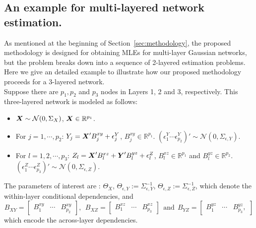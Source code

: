 \subsection{An example for multi-layered network estimation.} \label{appendix:example}
As mentioned at the beginning of Section~\ref{sec:methodology}, the proposed methodology is designed for obtaining MLEs for multi-layer Gaussian networks, but the problem breaks down into a sequence of 2-layered estimation problems. Here we give an detailed example to illustrate how our proposed methodology proceeds for a 3-layered network. \\

Suppose there are $p_1,p_2$ and $p_3$ nodes in Layers 1, 2 and 3, respectively. This three-layered network is modeled as follows: 
\begin{itemize}
 \setlength\itemsep{1pt}
\renewcommand\labelitemi{--}
\item $\boldsymbol{X}\sim \mathcal{N}(0,\Sigma_X)$, $\boldsymbol{X}\in\mathbb{R}^{p_1}$. 
\item For $j=1,\cdots,p_2$: $Y_j = \boldsymbol{X}'B_j^{xy}+\epsilon^Y_j$, $B_j^{xy}\in\mathbb{R}^{p_1}$. $(\epsilon^Y_1  \cdots \epsilon^Y_{p_2})'\sim \mathcal{N}(0,\Sigma_{\epsilon,Y})$. 
\item For $l=1,2,\cdots,p_3$: $Z_l = \boldsymbol{X}'B_l^{xz} + \boldsymbol{Y}'B_l^{yz}+\epsilon_l^Z$, $B_l^{xz}\in\mathbb{R}^{p_1}$ and $B_l^{yz}\in\mathbb{R}^{p_2}$. 
$(\epsilon^Z_1 \cdots \epsilon^Z_{p_3})'\sim \mathcal{N}(0,\Sigma_{\epsilon,Z})$.
\end{itemize}
The parameters of interest are : $\Theta_X$, $\Theta_{\epsilon,Y}:=\Sigma_{\epsilon,Y}^{-1}$, $\Theta_{\epsilon,Z}:=\Sigma_{\epsilon,Z}^{-1}$, which denote the within-layer conditional dependencies, and
\begin{equation*}
B_{XY} = \begin{bmatrix}
B_1^{xy} & \cdots & B_{p_2}^{xy}
\end{bmatrix},~~  B_{XZ} = \begin{bmatrix}
B_1^{xz} & \cdots & B_{p_3}^{xz}
\end{bmatrix} ~~\text{and}~~ B_{YZ} = \begin{bmatrix}
B_1^{yz} & \cdots & B_{p_3}^{yz},
\end{bmatrix}
\end{equation*}
which encode the across-layer dependencies.\\

